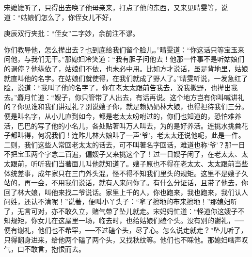 \begin{parag}


    宋嬷嬷听了，只得出去唤了他母亲来，打点了他的东西，又来见晴雯等，说道：“姑娘们怎么了，你侄女儿不好，\begin{note}庚辰双行夹批：“侄女”二字妙，余前注不谬。\end{note}你们教导他，怎么撵出去？也到底给我们留个脸儿。”晴雯道：“你这话只等宝玉来问他，与我们无干。”那媳妇冷笑道：“我有胆子问他去！他那一件事不是听姑娘们的调停？他纵依了，姑娘们不依，也未必中用。比如方才说话，虽是背地里，姑娘就直叫他的名字。在姑娘们就使得，在我们就成了野人了。”晴雯听说，一发急红了脸，说道：“我叫了他的名字了，你在老太太跟前告我去，说我撒野，也撵出我去。”麝月忙道：“嫂子，你只管带了人出去，有话再说。这个地方岂有你叫喊讲礼的？你见谁和我们讲过礼？别说嫂子你，就是赖奶奶林大娘，也得担待我们三分。便是叫名字，从小儿直到如今，都是老太太吩咐过的，你们也知道的，恐怕难养活，巴巴的写了他的小名儿，各处贴著叫万人叫去，为的是好养活。连挑水挑粪花子都叫得，何况我们！连昨儿林大娘叫了一声‘爷’，老太太还说他呢，此是一件。二则，我们这些人常回老太太的话去，可不叫著名字回话，难道也称‘爷’？那一日不把宝玉两个字念二百遍，偏嫂子又来挑这个了！过一日嫂子闲了，在老太太、太太跟前，听听我们当著面儿叫他就知道了。嫂子原也不得在老太太、太太跟前当些体统差事，成年家只在三门外头混，怪不得不知我们里头的规矩。这里不是嫂子久站的，再一会，不用我们说话，就有人来问你了。有什么分证话，且带了他去，你回了林大娘，叫他来找二爷说话。家里上千的人，你也跑来，我也跑来，我们认人问姓，还认不清呢！”说著，便叫小丫头子：“拿了擦地的布来擦地！”那媳妇听了，无言可对，亦不敢久立，赌气带了坠儿就走。宋妈妈忙道：“怪道你这嫂子不知规矩，你女儿在这屋里一场，临去时，也给姑娘们磕个头。没有别的谢礼，──便有谢礼，他们也不希罕，──不过磕个头，尽了心。怎么说走就走？”坠儿听了，只得翻身进来，给他两个磕了两个头，又找秋纹等。他们也不睬他。那媳妇嗐声叹气，口不敢言，抱恨而去。
\end{parag}


